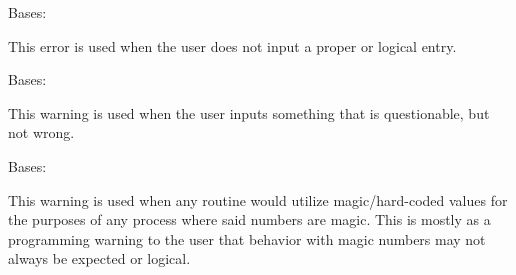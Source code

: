 \documentclass[letterpaper,10pt,english]{sphinxmanual}
\begin{document}

\begin{fulllineitems}
\label{\detokenize{python_docstrings/IfA_Smeargle.meta.errors:IfA_Smeargle.meta.errors.InputError}}
Bases: {\hyperref[\detokenize{python_docstrings/IfA_Smeargle.meta.errors:IfA_Smeargle.meta.errors.Smeargle_Exception}]{}}

This error is used when the user does not input a proper or logical entry.

\end{fulllineitems}


\begin{fulllineitems}
\label{\detokenize{python_docstrings/IfA_Smeargle.meta.errors:IfA_Smeargle.meta.errors.InputWarning}}
Bases: {\hyperref[\detokenize{python_docstrings/IfA_Smeargle.meta.errors:IfA_Smeargle.meta.errors.Smeargle_Warning}]{}}

This warning is used when the user inputs something that is questionable,
but not wrong.

\end{fulllineitems}


\begin{fulllineitems}
\label{\detokenize{python_docstrings/IfA_Smeargle.meta.errors:IfA_Smeargle.meta.errors.MagicWarning}}
Bases: {\hyperref[\detokenize{python_docstrings/IfA_Smeargle.meta.errors:IfA_Smeargle.meta.errors.Smeargle_Warning}]{}}

This warning is used when any routine would utilize magic/hard-coded
values for the purposes of any process where said numbers are magic. This
is mostly as a programming warning to the user that behavior with magic
numbers may not always be expected or logical.

\end{fulllineitems}
\end{document}
